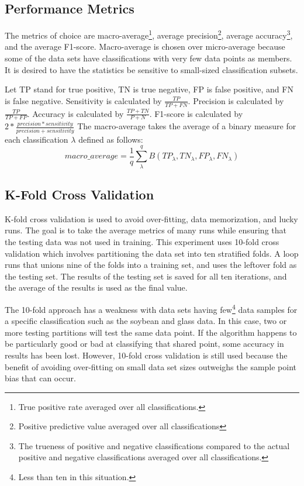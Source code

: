 \subsection{Performance Metrics} \label{subsec:performance-metrics}
The metrics of choice are macro-average\footnote{True positive rate averaged over all classifications.}, average precision\footnote{Positive predictive value averaged over all classifications}, average accuracy\footnote{The trueness of positive and negative classifications compared to the actual positive and negative classifications averaged over all classifications.}, and the average F1-score.  Macro-average is chosen over micro-average because some of the data sets have classifications with very few data points as members. It is desired to have the statistics be sensitive to small-sized classification subsets. 

Let TP stand for true positive, TN is true negative, FP is false positive, and FN is false negative.
Sensitivity is calculated by $\frac{TP}{TP + FN}$.
Precision is calculated by $\frac{TP}{TP + FP}$.
Accuracy is calculated by $\frac{TP + TN}{P + N}$.
F1-score is calculated by $2*\frac{precision*sensitivity}{precision + sensitivity}$
The macro-average takes the average of a binary measure for each classification $\lambda$ defined as follows:
\begin{equation} \label{eq:macro-average}
	macro\_average = \frac{1}{q}\sum_{\lambda}^{q} B(TP_\lambda , TN_\lambda, FP_\lambda, FN_\lambda)
\end{equation}

\subsection{K-Fold Cross Validation} \label{subsec:kfold-cv}
K-fold cross validation is used to avoid over-fitting, data memorization, and lucky runs.
The goal is to take the average metrics of many runs while ensuring that the testing data was not used in training.
This experiment uses 10-fold cross validation which involves partitioning the data set into ten stratified folds. 
A loop runs that unions nine of the folds into a training set, and uses the leftover fold as the testing set.
The results of the testing set is saved for all ten iterations, and the average of the results is used as the final value. 

The 10-fold approach has a weakness with data sets having few\footnote{Less than ten in this situation.} data samples for a specific classification such as the soybean and glass data.
In this case, two or more testing partitions will test the same data point.
If the algorithm happens to be particularly good or bad at classifying that shared point, some accuracy in results has been lost.
However, 10-fold cross validation is still used because the benefit of avoiding over-fitting on small data set sizes outweighs the sample point bias that can occur.

